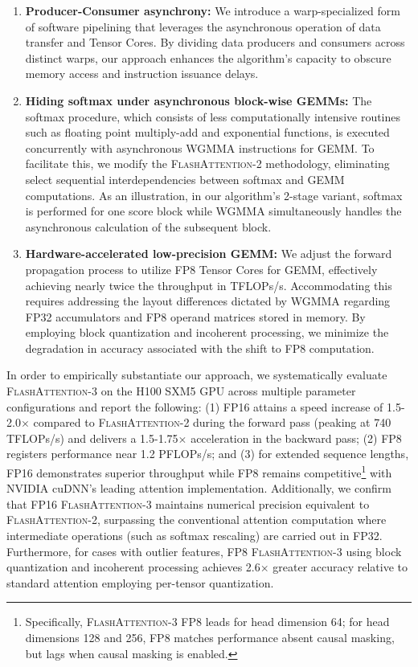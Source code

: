 \begin{enumerate}

\item \textbf{Producer-Consumer asynchrony:} We introduce a warp-specialized form of software pipelining that leverages the asynchronous operation of data transfer and Tensor Cores. By dividing data producers and consumers across distinct warps, our approach enhances the algorithm's capacity to obscure memory access and instruction issuance delays.
\item \textbf{Hiding softmax under asynchronous block-wise GEMMs:} The softmax procedure, which consists of less computationally intensive routines such as floating point multiply-add and exponential functions, is executed concurrently with asynchronous WGMMA instructions for GEMM. To facilitate this, we modify the \textsc{FlashAttention-2} methodology, eliminating select sequential interdependencies between softmax and GEMM computations. As an illustration, in our algorithm's 2-stage variant, softmax is performed for one score block while WGMMA simultaneously handles the asynchronous calculation of the subsequent block.
\item \textbf{Hardware-accelerated low-precision GEMM:} We adjust the forward propagation process to utilize FP8 Tensor Cores for GEMM, effectively achieving nearly twice the throughput in TFLOPs/s. Accommodating this requires addressing the layout differences dictated by WGMMA regarding FP32 accumulators and FP8 operand matrices stored in memory. By employing block quantization and incoherent processing, we minimize the degradation in accuracy associated with the shift to FP8 computation.
\end{enumerate}

In order to empirically substantiate our approach, we systematically evaluate \textsc{FlashAttention-3} on the H100 SXM5 GPU across multiple parameter configurations and report the following: (1) FP16 attains a speed increase of 1.5-2.0$\times$ compared to \textsc{FlashAttention-2} during the forward pass (peaking at 740 TFLOPs/s) and delivers a 1.5-1.75$\times$ acceleration in the backward pass; (2) FP8 registers performance near 1.2 PFLOPs/s; and (3) for extended sequence lengths, FP16 demonstrates superior throughput while FP8 remains competitive\footnote{Specifically, \textsc{FlashAttention-3} FP8 leads for head dimension 64; for head dimensions 128 and 256, FP8 matches performance absent causal masking, but lags when causal masking is enabled.} with NVIDIA cuDNN's leading attention implementation. Additionally, we confirm that FP16 \textsc{FlashAttention-3} maintains numerical precision equivalent to \textsc{FlashAttention-2}, surpassing the conventional attention computation where intermediate operations (such as softmax rescaling) are carried out in FP32. Furthermore, for cases with outlier features, FP8 \textsc{FlashAttention-3} using block quantization and incoherent processing achieves 2.6$\times$ greater accuracy relative to standard attention employing per-tensor quantization.

